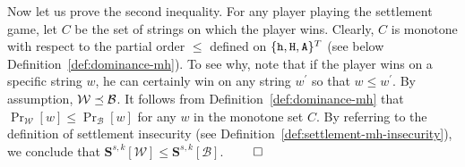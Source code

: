   Now let us prove the second inequality. 
  For any player playing the settlement game, 
  let $C$ be the set of strings on which the player wins. 
  Clearly, $C$ is monotone 
  with respect to the partial order $\leq$ 
  defined on $\{\mathtt{h}, \mathtt{H}, \mathtt{A}\}^T$ 
  (see below Definition~\ref{def:dominance-mh}).  
  To see why, note that if the player wins 
  on a specific string $w$, 
  he can certainly win on any string $w^\prime$ so that $w \leq w^\prime$. 
  By assumption, 
  $\mathcal{W} \preceq \mathcal{B}$. 
  It follows from Definition~\ref{def:dominance-mh} that 
  $\Pr_{\mathcal{W}}[w] \leq \Pr_{\mathcal{B}}[w]$ 
  for any $w$ in the monotone set $C$. 
  By referring to the definition of settlement insecurity 
  (see Definition~\ref{def:settlement-mh-insecurity}), 
  we conclude that 
  $
    \mathbf{S}^{s,k}[\mathcal{W}] \leq \mathbf{S}^{s,k}[\mathcal{B}]
  $.
  \hfill $\qed$  






